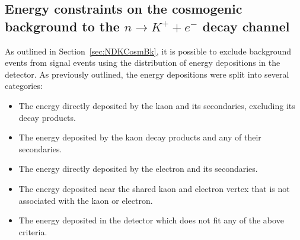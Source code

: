 \subsection{Energy constraints on the cosmogenic background to the $n \rightarrow K^{+} + e^{-}$ decay channel} \label{sec:NDKEnCosmBk}
As outlined in Section~\ref{sec:NDKCosmBk}, it is possible to exclude background events from signal events using the distribution of energy depositions in the detector. As previously outlined, the energy depositions were split into several categories:
\begin{itemize}
\item The energy directly deposited by the kaon and its secondaries, excluding its decay products.
\item The energy deposited by the kaon decay products and any of their secondaries.
\item The energy directly deposited by the electron and its secondaries.
\item The energy deposited near the shared kaon and electron vertex that is not associated with the kaon or electron.
\item The energy deposited in the detector which does not fit any of the above criteria.
\end{itemize}
